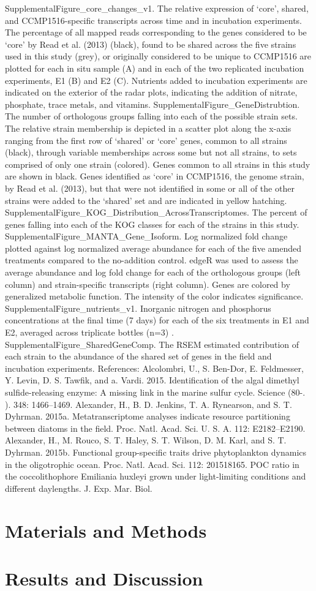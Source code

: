 SupplementalFigure\_core\_changes\_v1. The relative expression of ‘core’, shared, and CCMP1516-specific transcripts across time and in incubation experiments. The percentage of all mapped reads corresponding to the genes considered to be ‘core’ by Read et al. (2013) (black), found to be shared across the five strains used in this study (grey), or originally considered to be unique to CCMP1516 are plotted for each in situ sample (A) and in each of the two replicated incubation experiments, E1 (B) and E2 (C). Nutrients added to incubation experiments are indicated on the exterior of the radar plots, indicating the addition of nitrate, phosphate, trace metals, and vitamins.
SupplementalFigure\_GeneDistrubtion. The number of orthologous groups falling into each of the possible strain sets. The relative strain membership is depicted in a scatter plot along the x-axis ranging from the first row of ‘shared’ or ‘core’ genes, common to all strains (black), through variable memberships across some but not all strains, to sets comprised of only one strain (colored). Genes common to all strains in this study are shown in black. Genes identified as ‘core’ in CCMP1516, the genome strain, by Read et al. (2013), but that were not identified in some or all of the other strains were added to the ‘shared’ set and are indicated in yellow hatching. 
SupplementalFigure\_KOG\_Distribution\_AcrossTranscriptomes. The percent of genes falling into each of the KOG classes for each of the strains in this study.  
SupplementalFigure\_MANTA\_Gene\_Isoform. Log normalized fold change plotted against log normalized average abundance for each of the five amended treatments compared to the no-addition control. edgeR was used to assess the average abundance and log fold change for each of the orthologous groups (left column) and strain-specific transcripts (right column). Genes are colored by generalized metabolic function. The intensity of the color indicates significance. 
SupplementalFigure\_nutrients\_v1. Inorganic nitrogen and phosphorus concentrations at the final time (7 days) for each of the six treatments in E1 and E2, averaged across triplicate bottles (n=3) . 
SupplementalFigure\_SharedGeneComp. The RSEM estimated contribution of each strain to the abundance of the shared set of genes in the field and incubation experiments. 
References:
Alcolombri, U., S. Ben-Dor, E. Feldmesser, Y. Levin, D. S. Tawfik, and a. Vardi. 2015. Identification of the algal dimethyl sulfide-releasing enzyme: A missing link in the marine sulfur cycle. Science (80-. ). 348: 1466–1469.
Alexander, H., B. D. Jenkins, T. A. Rynearson, and S. T. Dyhrman. 2015a. Metatranscriptome analyses indicate resource partitioning between diatoms in the field. Proc. Natl. Acad. Sci. U. S. A. 112: E2182–E2190.
Alexander, H., M. Rouco, S. T. Haley, S. T. Wilson, D. M. Karl, and S. T. Dyhrman. 2015b. Functional group-specific traits drive phytoplankton dynamics in the oligotrophic ocean. Proc. Natl. Acad. Sci. 112: 201518165.
POC ratio in the coccolithophore Emiliania huxleyi grown under light-limiting conditions and different daylengths. J. Exp. Mar. Biol.

\section{Materials and Methods}
\section{Results and Discussion}
